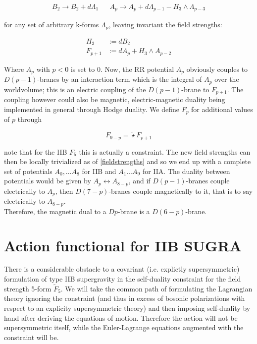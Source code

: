 \documentclass[11pt,a4paper,oneside,openright,titlepage]{book}
\begin{document}
\begin{align}
	B_2 \rightarrow B_2 + d\Lambda_1 && A_p \rightarrow A_p + d\Lambda_{p-1} - H_3 \wedge \Lambda_{p-3}
\end{align}

for any set of arbitrary k-forms $\Lambda_p$, leaving invariant the field strengths:

\begin{equation}
\begin{aligned}
	H_3 &:= dB_2 \\
	F_{p+1} &:= dA_p + H_3 \wedge A_{p-2} \label{fieldstrengths}
\end{aligned}
\end{equation}

Where $A_{p}$ with $p<0$ is set to $0$. Now, the RR potential $A_{p}$ obviously couples to $D(p-1)$-branes by an interaction term which is the integral of $A_{p}$ over the worldvolume; this is an electric coupling of the $D(p-1)$-brane to $F_{p+1}$. The coupling however could also be magnetic, electric-magnetic duality being implemented in general through Hodge duality. We define $F_p$ for additional values of $p$ through

\begin{equation}
	F_{9-p} = \widetilde\star F_{p+1}
\end{equation}

note that for the IIB $F_5$ this is actually a constraint. The new field strengths can then be locally trivialized as of \ref{fieldstrengths} and so we end up with a complete set of potentials $A_0, \ldots A_8$ for IIB and $A_1 \ldots A_9$ for IIA. The duality between potentials would be given by $A_p \leftrightarrow A_{8-p}$, and if $D(p-1)$-branes couple electrically to $A_p$, then $D(7-p)$-branes couple magnetically to it, that is to say electrically to $A_{8-p}$.\\

Therefore, the magnetic dual to a $Dp$-brane is a $D(6-p)$-brane.

\section{Action functional for IIB SUGRA}

There is a considerable obstacle to a covariant (i.e. explictly supersymmetric) formulation of type IIB supergravity in the self-duality constraint for the field strength 5-form $\tilde{F}_5$. We will take the common path of formulating the Lagrangian theory ignoring the constraint (and thus in excess of bosonic polarizations with respect to an explicity supersymmetric theory) and then imposing self-duality by hand after deriving the equations of motion. Therefore the action will not be supersymmetric itself, while the Euler-Lagrange equations augmented with the constraint will be.\\
\end{document}
